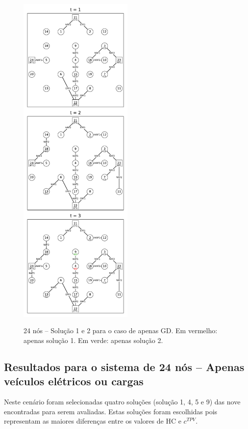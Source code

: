 \begin{figure}[H]
 	\centering
    \caption{24 nós -- Solução 1 e 2 para o caso de apenas GD. Em vermelho: apenas solução 1. Em verde: apenas solução 2.}
    \includegraphics[width=0.5\textwidth]{cap4/resultados/24_gen2.pdf}\\
    \label{fig:24_gen}
\end{figure}

\subsection{Resultados para o sistema de 24 nós -- Apenas veículos elétricos ou cargas}

Neste cenário foram selecionadas quatro soluções (solução 1, 4, 5 e 9) das nove encontradas para serem avaliadas. Estas soluções foram escolhidas pois representam as maiores diferenças entre os valores de \ac{HC} e $c^{TPV}$.

